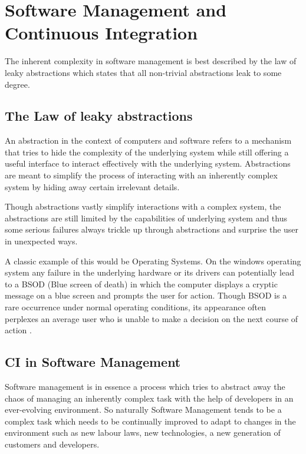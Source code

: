 \documentclass[10pt,conference]{IEEEtran}
\begin{document}
\section*{Software Management and Continuous Integration}

The inherent complexity in software management is best described by the law of leaky abstractions \cite{spolsky_law_2002} which states that all non-trivial abstractions leak to some degree. 

\subsection*{The Law of leaky abstractions}

An abstraction in the context of computers and software refers to a mechanism that tries to hide the complexity of the underlying system while still offering a useful interface to interact effectively with the underlying system. Abstractions are meant to simplify the process of interacting with an inherently complex system by hiding away certain irrelevant details.

Though abstractions vastly simplify interactions with a complex system, the abstractions are still limited by the capabilities of underlying system and  thus some serious failures always trickle up through abstractions and surprise the user in unexpected ways.

A classic example of this would be Operating Systems. On the windows operating system any failure in the underlying hardware or its drivers can potentially lead to a BSOD (Blue screen of death) in which the computer displays a cryptic message on a blue screen and prompts the user for action. Though BSOD is a rare occurrence under normal operating conditions, its appearance often perplexes an average user who is unable to make a decision on the next course of action \cite{rosenberg_law_2007}. 

\subsection*{CI in Software Management}

Software management is in essence a process which tries to abstract away the chaos of managing an inherently complex task with the help of developers in an ever-evolving environment. So naturally Software Management tends to be a complex task which needs to be continually improved to adapt to changes in the environment such as new labour laws, new technologies, a new generation of customers and developers. 
\end{document}
